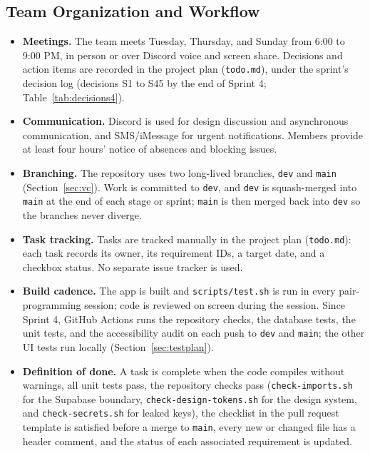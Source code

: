 \documentclass[12pt,letterpaper]{article}
\begin{document}
\subsection{Team Organization and Workflow}
\begin{itemize}
  \item \textbf{Meetings.} The team meets Tuesday, Thursday, and Sunday from 6:00 to
        9:00 PM, in person or over Discord voice and screen share. Decisions and
        action items are recorded in the project plan (\texttt{todo.md}), under
        the sprint's decision log (decisions S1 to S45 by the end
        of Sprint 4; Table~\ref{tab:decisions4}).
  \item \textbf{Communication.} Discord is used for design discussion and asynchronous
        communication, and SMS/iMessage for urgent notifications. Members provide at
        least four hours' notice of absences and blocking issues.
  \item \textbf{Branching.} The repository uses two long-lived branches, \texttt{dev}
        and \texttt{main} (Section~\ref{sec:vc}). Work is committed to \texttt{dev},
        and \texttt{dev} is squash-merged into \texttt{main} at the end of each stage
        or sprint; \texttt{main} is then merged back into \texttt{dev} so the branches
        never diverge.
  \item \textbf{Task tracking.} Tasks are tracked manually in the project plan
        (\texttt{todo.md}): each task records its owner, its requirement IDs, a
        target date, and a checkbox status. No separate issue tracker is used.
  \item \textbf{Build cadence.} The app is built and \texttt{scripts/test.sh} is run
        in every pair-programming session; code is reviewed on screen during the
        session. Since Sprint 4, GitHub Actions runs the repository checks, the
        database tests, the unit tests, and the accessibility audit on each push to
        \texttt{dev} and \texttt{main}; the other UI tests run locally
        (Section~\ref{sec:testplan}).
  \item \textbf{Definition of done.} A task is complete when the code compiles without
        warnings, all unit tests pass, the repository checks pass
        (\texttt{check-imports.sh} for the Supabase boundary,
        \texttt{check-design-tokens.sh} for the design system, and
        \texttt{check-secrets.sh} for leaked keys), the checklist in the pull request
        template is satisfied before a merge to \texttt{main}, every new or changed file has a header comment, and the status of
        each associated requirement is updated.
\end{itemize}
\end{document}
